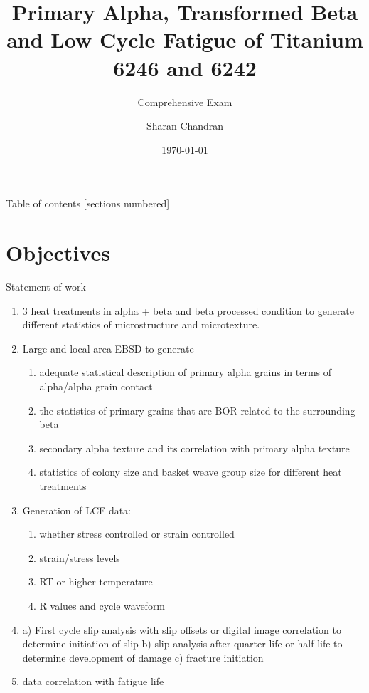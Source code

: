 \documentclass[10pt]{beamer}
\title{Primary Alpha, Transformed Beta and Low Cycle Fatigue of Titanium 6246 and 6242}
\subtitle{Comprehensive Exam}
\date{\today}
\date{}
\author{Sharan Chandran}
\institute{Indian Institute of Science}
\begin{document}

\renewcommand\sfdefault{phv}
\renewcommand\mddefault{mc}
\renewcommand\bfdefault{bc}
\sffamily

\maketitle

\begin{frame}{Table of contents}
  [sections numbered]
  \tableofcontents[hideallsubsections]
\end{frame}

\section{Objectives}

\begin{frame}[fragile]{Statement of work}

\begin{enumerate}
\item 3 heat treatments in alpha + beta and beta processed condition to generate different statistics of microstructure and microtexture.
\item Large and local area EBSD to generate
\begin{enumerate}
\footnotesize
\item adequate statistical description of primary alpha grains in terms of alpha/alpha grain contact
\item the statistics of primary grains that are BOR related to the surrounding beta
\item secondary alpha texture and its correlation with primary alpha texture
\item statistics of colony size and basket weave group size  for different heat treatments
\end{enumerate}
\item Generation of LCF data: 
\begin{enumerate}
\color{red}
\footnotesize
\item whether stress controlled or strain controlled
\item strain/stress levels
\item RT or higher temperature
\item R values and  cycle waveform
\end{enumerate}

\item a) First cycle slip analysis with slip offsets or digital image correlation to determine initiation of slip b) slip analysis after quarter life or half-life to determine development of damage c) fracture initiation
\item data correlation with fatigue life
\end{enumerate}

\end{frame}
\end{document}
